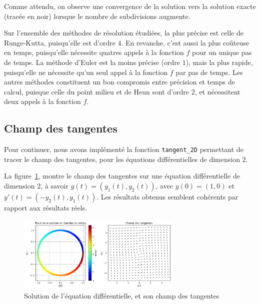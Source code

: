 Comme attendu, on observe une convergence de la solution vers la solution exacte (tracée en noir)
lorsque le nombre de subdivisions augmente.

Sur l'ensemble des méthodes de résolution étudiées, la plus précise est celle de Runge-Kutta, puisqu'elle est d'ordre $4$.
En revanche, c'est aussi la plus coûteuse en temps, puisqu'elle nécessite quatres appels à la fonction $f$ pour un unique pas de temps.
La méthode d'Euler est la moins précise (ordre $1$), mais la plus rapide, puisqu'elle ne nécessite qu'un seul appel à la fonction $f$ par pas de temps.
Les autres méthodes constituent un bon compromis entre précision et temps de calcul, puisque celle du point milieu et de Heun sont d'ordre $2$, et nécessitent deux appels à la fonction $f$.

\subsection{Champ des tangentes}
Pour continuer, nous avons implémenté la fonction \texttt{tangent\_2D} permettant de tracer le champ des tangentes,
pour les équations différentielles de dimension $2$.

La figure~\ref{fig:tangente}, montre le champ des tangentes sur une équation différentielle
de dimension $2$, à savoir $y(t)=(y_1(t),y_2(t))$, avec $y(0)=(1,0)$ et $y'(t)=(-y_2(t),y_1(t))$.
Les résultats obtenus semblent cohérents par rapport aux résultats réels.

\begin{figure}[htbp!]
	\centering
	\includegraphics[width=0.7\textwidth]{res/tangente}
	\caption{Solution de l'équation différentielle, et son champ des tangentes}
	\label{fig:tangente}
\end{figure}
